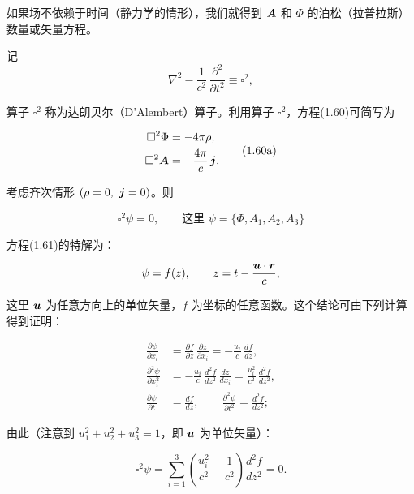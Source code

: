 如果场不依赖于时间（静力学的情形），我们就得到 $\bm{A}$ 和 $\Phi$ 的泊松（拉普拉斯）数量或矢量方程。

记
\begin{equation*}
\nabla^{2} - \frac{1}{c^{2}}\, \frac{\partial^{2}}{\partial t^{2}} \equiv \square^{2},
\end{equation*}

算子 $\square^{2}$ 称为达朗贝尔（D'Alembert）算子。利用算子 $\square^{2}$，方程(1.60)可简写为

\begin{equation}
\begin{aligned}
\square^{2}\Phi &= -4\pi\rho,\\
\square^{2}\bm{A} &= -\frac{4\pi}{c}\, \bm{j}.
\end{aligned}
\tag{1.60a}
\end{equation}

考虑齐次情形 $(\rho = 0,\ \bm{j} = 0)$。则

\begin{equation}
\square^{2}\psi = 0, \qquad \text{这里 } \psi = \{\Phi, A_1, A_2, A_3\}
\tag{1.61}
\end{equation}

方程(1.61)的特解为：

\begin{equation*}
\psi = f(z), \qquad z = t - \frac{\bm{u} \cdot \bm{r}}{c},
\end{equation*}

这里 $\bm{u}$ 为任意方向上的单位矢量，$f$ 为坐标的任意函数。这个结论可由下列计算得到证明：

\begin{equation*}
\begin{aligned}
\frac{\partial\psi}{\partial x_i} &= \frac{\partial f}{\partial z}\, \frac{\partial z}{\partial x_i} = -\frac{u_i}{c}\, \frac{df}{dz},\\
\frac{\partial^{2}\psi}{\partial x_i^{2}} &= -\frac{u_i}{c}\, \frac{d^{2}f}{dz^{2}}\, \frac{dz}{dx_i} = \frac{u_i^{2}}{c^{2}}\, \frac{d^{2}f}{dz^{2}},\\
\frac{\partial\psi}{\partial t} &= \frac{df}{dz}, \qquad \frac{\partial^{2}\psi}{\partial t^{2}} = \frac{d^{2}f}{dz^{2}};
\end{aligned}
\end{equation*}

由此（注意到 $u_1^{2} + u_2^{2} + u_3^{2} = 1$，即 $\bm{u}$ 为单位矢量）：

\begin{equation}
\square^{2}\psi = \sum_{i=1}^{3} \left(\frac{u_i^{2}}{c^{2}} - \frac{1}{c^{2}}\right) \frac{d^{2}f}{dz^{2}} = 0.
\tag{1.61a}
\end{equation}

